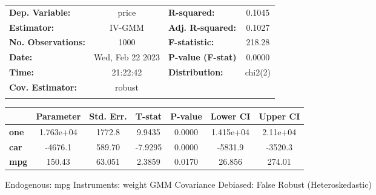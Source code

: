 \begin{center}
\begin{tabular}{lclc}
\toprule
\textbf{Dep. Variable:}    &       price        & \textbf{  R-squared:         } &      0.1045      \\
\textbf{Estimator:}        &       IV-GMM       & \textbf{  Adj. R-squared:    } &      0.1027      \\
\textbf{No. Observations:} &        1000        & \textbf{  F-statistic:       } &      218.28      \\
\textbf{Date:}             &  Wed, Feb 22 2023  & \textbf{  P-value (F-stat)   } &      0.0000      \\
\textbf{Time:}             &      21:22:42      & \textbf{  Distribution:      } &     chi2(2)      \\
\textbf{Cov. Estimator:}   &       robust       & \textbf{                     } &                  \\
\textbf{}                  &                    & \textbf{                     } &                  \\
\bottomrule
\end{tabular}
\begin{tabular}{lcccccc}
             & \textbf{Parameter} & \textbf{Std. Err.} & \textbf{T-stat} & \textbf{P-value} & \textbf{Lower CI} & \textbf{Upper CI}  \\
\midrule
\textbf{one} &     1.763e+04      &       1772.8       &      9.9435     &      0.0000      &     1.415e+04     &      2.11e+04      \\
\textbf{car} &      -4676.1       &       589.70       &     -7.9295     &      0.0000      &      -5831.9      &      -3520.3       \\
\textbf{mpg} &       150.43       &       63.051       &      2.3859     &      0.0170      &       26.856      &       274.01       \\
\bottomrule
\end{tabular}
\end{center}

Endogenous: mpg \newline
 Instruments: weight \newline
 GMM Covariance \newline
 Debiased: False \newline
 Robust (Heteroskedastic)